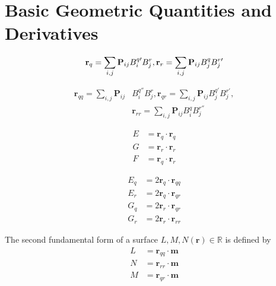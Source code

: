 \documentclass[journal]{IEEEtran}
\renewcommand{\vec}[1]{\mathbf{#1}}
\theoremstyle{definition}
\renewcommand{\vec}[1]{\mathbf{#1}}
\begin{document}
\section{Basic Geometric Quantities and Derivatives}
\label{appendix_GQ_Derivatives}
\begin{equation}
  \mathbf{r}_q = \sum_{i,j} \mathbf{P}_{ij} B_i^{q \space \prime} B_j^r, \mathbf{r}_r = \sum_{i,j} \mathbf{P}_{ij} B_j^q B_j^{r\space \prime}\\
\end{equation}

\begin{equation}
  \begin{split}
    \mathbf{r}_{qq} = \sum_{i,j} \mathbf{P}_{ij} &B_i^{q ''} B_j^r, \mathbf{r}_{qr} = \sum_{i,j} \mathbf{P}_{ij} B_j^{q'} B_j^{r'}, \\
    &\mathbf{r}_{rr} = \sum_{i,j} \mathbf{P}_{ij} B_i^{q } B_j^{r''}
  \end{split}
\end{equation}

\begin{subequations}
  \begin{align}
    E & =\mathbf{r}_q \cdot \mathbf{r}_q \\
    G & =\mathbf{r}_r \cdot \mathbf{r}_r \\
    F & =\mathbf{r}_q \cdot \mathbf{r}_r
  \end{align}
\end{subequations}

\begin{subequations}
  \begin{align}
    E_q & =2\mathbf{r}_q \cdot \mathbf{r}_{qq} \\
    E_r & =2\mathbf{r}_q \cdot \mathbf{r}_{qr} \\
    G_q & =2\mathbf{r}_r \cdot \mathbf{r}_{qr} \\
    G_r & =2\mathbf{r}_r \cdot \mathbf{r}_{rr}
  \end{align}
\end{subequations}

The second fundamental form of a surface $L,M,N(\vec{r})\in\mathbb{R}$ is defined by
\begin{subequations}
  \begin{align}
    L & = \mathbf{r}_{qq} \cdot \mathbf{m} \\
    N & = \mathbf{r}_{rr} \cdot \mathbf{m} \\
    M & = \mathbf{r}_{qr} \cdot \mathbf{m}
  \end{align}
\end{subequations}
\end{document}
